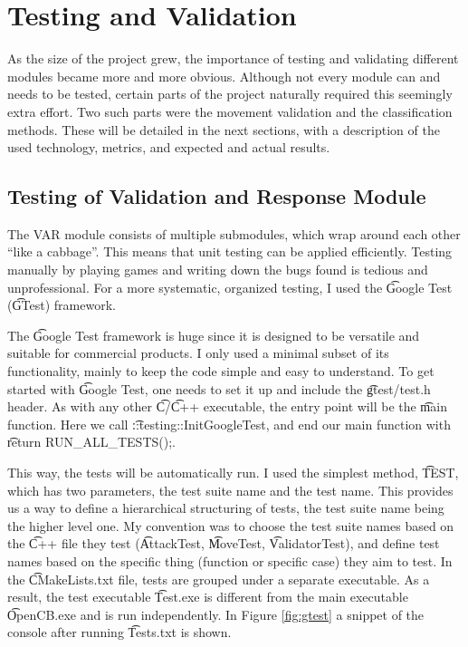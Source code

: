 \chapter{Testing and Validation} \label{ch:testing-and-validation} \pagestyle{fancy}

As the size of the project grew, the importance of testing and validating different modules became more and more obvious. Although not every module can and needs to be tested, certain parts of the project naturally required this seemingly extra effort. Two such parts were the movement validation and the classification methods. These will be detailed in the next sections, with a description of the used technology, metrics, and expected and actual results.



\section{Testing of Validation and Response Module}

The VAR module consists of multiple submodules, which wrap around each other ``like a cabbage''. This means that unit testing can be applied efficiently. Testing manually by playing games and writing down the bugs found is tedious and unprofessional. For a more systematic, organized testing, I used the \t{Google Test} (\t{GTest}) framework.

The \t{Google Test} framework is huge since it is designed to be versatile and suitable for commercial products. I only used a minimal subset of its functionality, mainly to keep the code simple and easy to understand. To get started with \t{Google Test}, one needs to set it up and include the \t{gtest/test.h} header. As with any other \t{C}/\t{C++} executable, the entry point will be the \t{main} function. Here we call \t{::testing::InitGoogleTest}, and end our main function with \t{return RUN\_ALL\_TESTS();}.

This way, the tests will be automatically run. I used the simplest method, \t{TEST}, which has two parameters, the test suite name and the test name. This provides us a way to define a hierarchical structuring of tests, the test suite name being the higher level one. My convention was to choose the test suite names based on the \t{C++} file they test (\t{AttackTest}, \t{MoveTest}, \t{ValidatorTest}), and define test names based on the specific thing (function or specific case) they aim to test. In the \t{CMakeLists.txt} file, tests are grouped under a separate executable. As a result, the test executable \t{Test.exe} is different from the main executable \t{OpenCB.exe} and is run independently. In Figure \ref{fig:gtest} a snippet of the console after running \t{Tests.txt} is shown.

